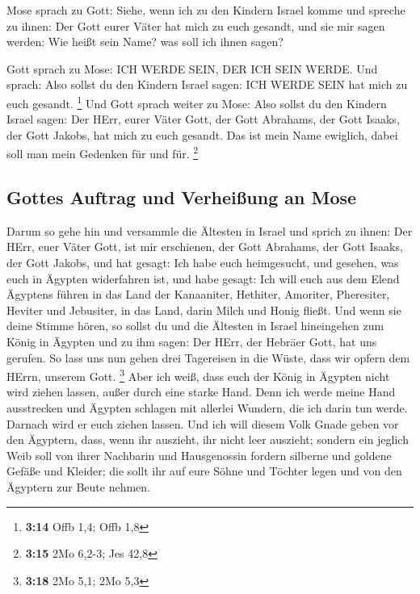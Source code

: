  Mose sprach zu Gott: Siehe, wenn ich zu den Kindern
Israel komme und spreche zu ihnen: Der Gott eurer Väter hat mich zu euch
gesandt, und sie mir sagen werden: Wie heißt sein Name? was soll ich
ihnen sagen?

 Gott sprach zu Mose: ICH WERDE SEIN, DER ICH SEIN WERDE.
Und sprach: Also sollst du den Kindern Israel sagen: ICH WERDE SEIN hat
mich zu euch gesandt. \footnote{\textbf{3:14} Offb 1,4; Offb 1,8}
 Und Gott sprach weiter zu Mose: Also sollst du den
Kindern Israel sagen: Der HErr, eurer Väter Gott, der Gott Abrahams, der
Gott Isaaks, der Gott Jakobs, hat mich zu euch gesandt. Das ist mein
Name ewiglich, dabei soll man mein Gedenken für und für. \footnote{\textbf{3:15}
  2Mo 6,2-3; Jes 42,8}

\hypertarget{gottes-auftrag-und-verheiuxdfung-an-mose}{%
\subsection{Gottes Auftrag und Verheißung an
Mose}\label{gottes-auftrag-und-verheiuxdfung-an-mose}}

 Darum so gehe hin und versammle die Ältesten in Israel
und sprich zu ihnen: Der HErr, euer Väter Gott, ist mir erschienen, der
Gott Abrahams, der Gott Isaaks, der Gott Jakobs, und hat gesagt: Ich
habe euch heimgesucht, und gesehen, was euch in Ägypten widerfahren ist,
 und habe gesagt: Ich will euch aus dem Elend Ägyptens
führen in das Land der Kanaaniter, Hethiter, Amoriter, Pheresiter,
Heviter und Jebusiter, in das Land, darin Milch und Honig fließt.
 Und wenn sie deine Stimme hören, so sollst du und die
Ältesten in Israel hineingehen zum König in Ägypten und zu ihm sagen:
Der HErr, der Hebräer Gott, hat uns gerufen. So lass uns nun gehen drei
Tagereisen in die Wüste, dass wir opfern dem HErrn, unserem Gott.
\footnote{\textbf{3:18} 2Mo 5,1; 2Mo 5,3}  Aber ich weiß,
dass euch der König in Ägypten nicht wird ziehen lassen, außer durch
eine starke Hand.  Denn ich werde meine Hand ausstrecken
und Ägypten schlagen mit allerlei Wundern, die ich darin tun werde.
Darnach wird er euch ziehen lassen.  Und ich will diesem
Volk Gnade geben vor den Ägyptern, dass, wenn ihr auszieht, ihr nicht
leer auszieht;  sondern ein jeglich Weib soll von ihrer
Nachbarin und Hausgenossin fordern silberne und goldene Gefäße und
Kleider; die sollt ihr auf eure Söhne und Töchter legen und von den
Ägyptern zur Beute nehmen.

